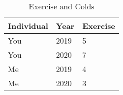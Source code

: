 \begin{table}[!htbp] \centering \renewcommand*{\arraystretch}{1.1}\caption{Exercise and Colds}\label{tab:fixedeffects-within1}
\begin{tabular}{lll}
\hline
\hline
Individual & Year & Exercise \\ 
\hline
You & 2019 & 5 \\ 
You & 2020 & 7 \\ 
Me & 2019 & 4 \\ 
Me & 2020 & 3\\ 
\hline
\hline
\end{tabular}
\end{table}

